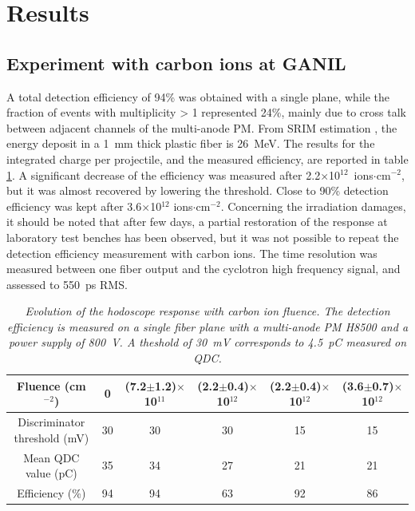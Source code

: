 \documentclass[a4paper,11pt]{article}
\begin{document}
\section{Results}
\subsection{Experiment with carbon ions at GANIL}
A total detection efficiency of 94\% was obtained with a single plane, while the fraction of events with multiplicity > 1 represented 24\%, mainly due to cross talk between adjacent channels of the multi-anode PM.
From SRIM estimation \cite{Ziegler2010}, the energy deposit in a 1~mm thick plastic fiber is 26~MeV. The results for the integrated charge per projectile, and the measured efficiency, are reported in table \ref{tab:GANIL}. A significant decrease of the efficiency was measured after 2.2$\times$10$^{12}$~ions$\cdot$cm$^{-2}$, but it was almost recovered by lowering the threshold. 
Close to 90\% detection efficiency was kept after 3.6$\times$10$^{12}$ ions$\cdot$cm$^{-2}$.
Concerning the irradiation damages, it should be noted that after few days, a partial restoration of the response at laboratory test benches has been observed, but it was not possible to repeat the detection efficiency measurement with carbon ions. 
The time resolution was measured between one fiber output and the cyclotron high frequency signal, and assessed to 550~ps RMS. 
\begin{table}[htb]
\caption{\small{\textit{Evolution of the hodoscope response with carbon ion fluence. The detection efficiency is measured on a single fiber plane with a multi-anode PM H8500 and a power supply of 800~V. A theshold of 30~mV corresponds to 4.5~pC measured on QDC.}}}
\centering
\begin{tabular}{|c|c|c|c|c|c|}
\hline
Fluence (cm$^{-2}$)& 0 & (7.2$\pm$1.2)$\times$10$^{11}$ & (2.2$\pm$0.4)$\times$10$^{12}$ & (2.2$\pm$0.4)$\times$10$^{12}$ & (3.6$\pm$0.7)$\times$10$^{12}$\\
\hline
\makecell{Discriminator\\threshold (mV)} & 30 & 30 & 30 & 15 & 15\\
\hline
\makecell{Mean QDC\\value (pC)} & 35 & 34 & 27 & 21 & 21\\
\hline
Efficiency (\%) & 94 & 94 & 63 & 92 & 86\\
\hline
\end{tabular}
\label{tab:GANIL}
\end{table}
\end{document}
